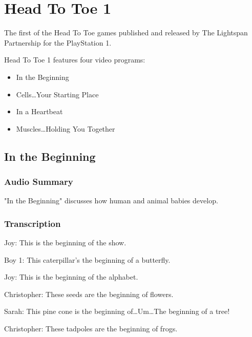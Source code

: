 \chapter{Head To Toe 1}


The first of the Head To Toe games published and released by The Lightspan Partnership for the PlayStation 1.

Head To Toe 1 features four video programs:

\begin{itemize}
    \item In the Beginning
    \item Cells\dots Your Starting Place
    \item In a Heartbeat
    \item Muscles\dots Holding You Together
\end{itemize}

\clearpage
\newpage

\section{In the Beginning}

\subsection{Audio Summary}

"In the Beginning" discusses how human and animal babies develop.

\subsection{Transcription}

Joy: This is the beginning of the show.

Boy 1: This caterpillar's the beginning of a butterfly.

Joy: This is the beginning of the alphabet.

Christopher: These seeds are the beginning of flowers.

Sarah: This pine cone is the beginning of\dots Um\dots The beginning of a tree!

Christopher: These tadpoles are the beginning of frogs.

